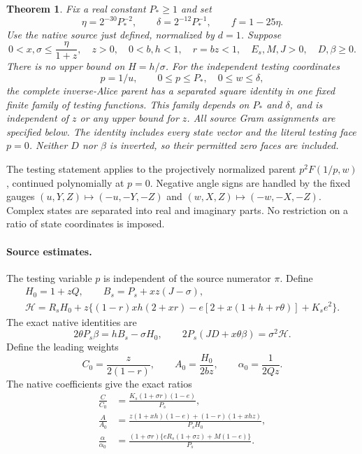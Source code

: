 \documentclass[11pt]{article}
\newtheorem{theorem}{Theorem}
\begin{document}
\begin{theorem}\label{thm:allz}
Fix a real constant $P_*\ge1$ and set
\[
 \eta=2^{-30}P_*^{-2},\qquad
 \delta=2^{-12}P_*^{-1},\qquad f=1-25\eta.
\]
Use the native source just defined, normalized by $d=1$. Suppose
\begin{equation}\label{eq:domain}
 0<x,\sigma\le\frac\eta{1+z},\quad z>0,\quad
 0<b,h<1,\quad r=bz<1,\quad E_s,M,J>0,\quad D,\beta\ge0.
\end{equation}
There is no upper bound on $H=h/\sigma$. For the independent testing
coordinates
\[
 p=1/u,\qquad 0\le p\le P_*,\quad 0\le w\le\delta,
\]
the complete inverse-Alice parent has a separated square identity in
one fixed finite family of testing functions. This family depends on
$P_*$ and $\delta$, and is independent of $z$ or any upper bound for
$z$. All source Gram assignments are specified below. The identity
includes every state vector and the literal testing face $p=0$.
Neither $D$ nor $\beta$ is inverted, so their permitted zero faces
are included.
\end{theorem}

The testing statement applies to the projectively normalized parent
$p^2F(1/p,w)$, continued polynomially at $p=0$. Negative angle signs
are handled by the fixed gauges
$(u,Y,Z)\mapsto(-u,-Y,-Z)$ and
$(w,X,Z)\mapsto(-w,-X,-Z)$. Complex states are separated into real
and imaginary parts. No restriction on a ratio of state coordinates
is imposed.

\paragraph{Source estimates.}
The testing variable $p$ is independent of the source numerator $\pi$.
Define
\begin{gather*}
 H_0=1+zQ,\qquad B_s=P_s+xz(J-\sigma),\\
 \mathcal H=R_sH_0+z\{(1-r)xh(2+xr)
                  -e[2+x(1+h+r\theta)]+K_s e^2\}.
\end{gather*}
The exact native identities are
\begin{equation}\label{eq:BE}
 2\theta P_s\beta=hB_s-\sigma H_0,\qquad
 2P_s(JD+x\theta\beta)=\sigma^2\mathcal H.
\end{equation}
Define the leading weights
\begin{equation}\label{eq:leadingweights}
 C_0=\frac{z}{2(1-r)},\qquad
 A_0=\frac{H_0}{2bz},\qquad
 \alpha_0=\frac1{2Qz}.
\end{equation}
The native coefficients give the exact ratios
\begin{align}
 \frac C{C_0}&=\frac{K_s(1+\sigma r)(1-e)}{P_s},\label{eq:ratioC}\\
 \frac A{A_0}&=
 \frac{z(1+xh)(1-e)+(1-r)(1+xhz)}{P_sH_0},\label{eq:ratioA}\\
 \frac\alpha{\alpha_0}&=
 \frac{(1+\sigma r)\{eR_s(1+\sigma z)+M(1-e)\}}{P_s}.
 \label{eq:ratioalpha}
\end{align}
\end{document}
